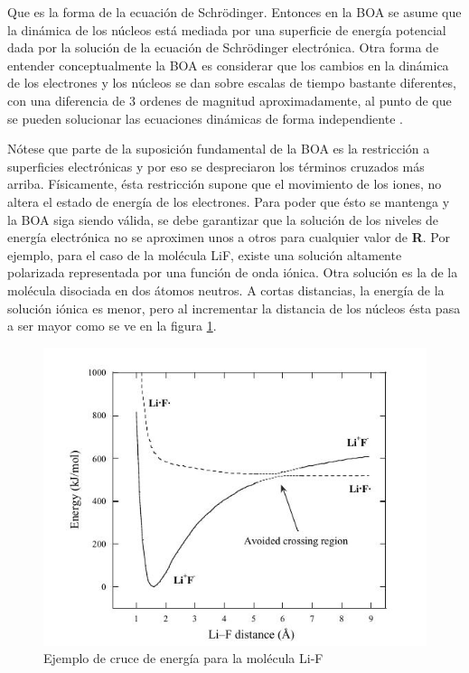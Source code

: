 \documentclass [11pt]{article}
\begin{document}
Que es la forma de la ecuación de Schrödinger. Entonces en la BOA se asume que la dinámica de los núcleos está mediada por una superficie de energía potencial dada por la solución de la ecuación de Schrödinger electrónica. Otra forma de entender conceptualmente la BOA es considerar que los cambios en la dinámica de los electrones y los núcleos se dan sobre escalas de tiempo bastante diferentes, con una diferencia de 3 ordenes de magnitud aproximadamente, al punto de que se pueden solucionar las ecuaciones dinámicas de forma independiente \cite{bransden}.

Nótese que parte de la suposición fundamental de la BOA es la restricción a superficies electrónicas y por eso se despreciaron los términos cruzados más arriba. Físicamente, ésta restricción supone que el movimiento de los iones, no altera el estado de energía de los electrones. Para poder que ésto se mantenga y la BOA siga siendo válida, se debe garantizar que la solución de los niveles de energía electrónica no se aproximen unos a otros para cualquier valor de {\bf R}. Por ejemplo, para el caso de la molécula LiF, existe una solución altamente polarizada representada por una función de onda iónica. Otra solución es la de la molécula disociada en dos átomos neutros. A cortas distancias, la energía de la solución iónica es menor, pero al incrementar la distancia de los núcleos ésta pasa a ser mayor como se ve en la figura \ref{cross}.\\

\begin{figure}[t]
\centering
\includegraphics[width=0.8\linewidth]{cross_energy}
\caption{Ejemplo de cruce de energía para la molécula Li-F}
\label{cross}
\end{figure}
\end{document}
